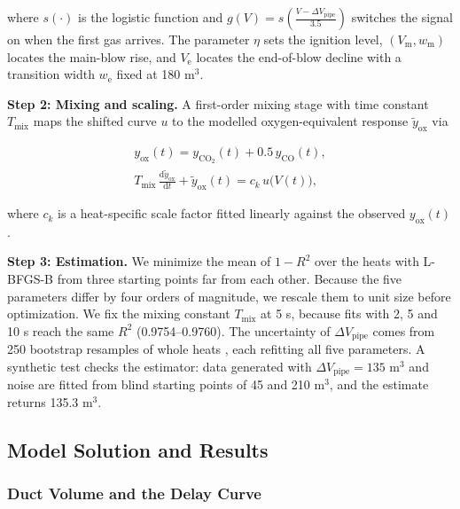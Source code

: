 where $s(\cdot)$ is the logistic function and $g(V) = s\!\left(\frac{V-\Delta V_{\mathrm{pipe}}}{3.5}\right)$ switches the signal on when the first gas arrives. The parameter $\eta$ sets the ignition level, $(V_{\mathrm{m}}, w_{\mathrm{m}})$ locates the main-blow rise, and $V_{\mathrm{e}}$ locates the end-of-blow decline with a transition width $w_{\mathrm{e}}$ fixed at 180 m\ensuremath{^{3}}.

\textbf{Step 2: Mixing and scaling.} A first-order mixing stage with time constant $T_{\mathrm{mix}}$ maps the shifted curve $u$ to the modelled oxygen-equivalent response $\tilde{y}_{\mathrm{ox}}$ via

\begin{equation}
\begin{gathered}
  y_{\mathrm{ox}}(t) = y_{\mathrm{CO_2}}(t) + 0.5\,y_{\mathrm{CO}}(t), \\
  T_{\mathrm{mix}}\,\frac{\mathrm{d}\tilde{y}_{\mathrm{ox}}}{\mathrm{d}t} + \tilde{y}_{\mathrm{ox}}(t) = c_k\,u\bigl(V(t)\bigr),
\end{gathered} \label{eq:pfd_mix}
\end{equation}

where $c_k$ is a heat-specific scale factor fitted linearly against the observed $y_{\mathrm{ox}}(t)$.

\textbf{Step 3: Estimation.} We minimize the mean of $1-R^2$ over the heats with L-BFGS-B \cite{ref:5} from three starting points far from each other. Because the five parameters differ by four orders of magnitude, we rescale them to unit size before optimization. We fix the mixing constant $T_{\mathrm{mix}}$ at 5 s, because fits with 2, 5 and 10 s reach the same $R^2$ (0.9754–0.9760). The uncertainty of $\Delta V_{\mathrm{pipe}}$ comes from 250 bootstrap resamples of whole heats \cite{ref:6}, each refitting all five parameters. A synthetic test checks the estimator: data generated with $\Delta V_{\mathrm{pipe}} = 135$ m\ensuremath{^{3}} and noise are fitted from blind starting points of 45 and 210 m\ensuremath{^{3}}, and the estimate returns 135.3 m\ensuremath{^{3}}.

\subsection{Model Solution and Results}\label{sec:6.4}

\subsubsection{Duct Volume and the Delay Curve}\label{sec:6.4.1}

